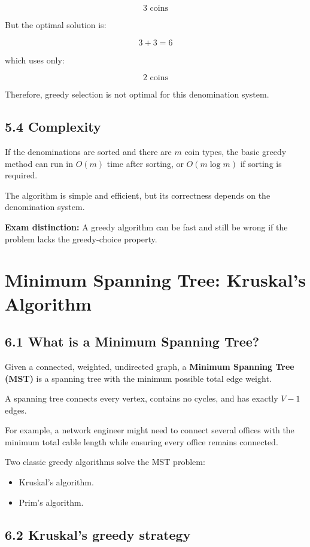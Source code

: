 \[
\boxed{3\text{ coins}}
\]


But the optimal solution is:


\[
3+3=6
\]


which uses only:


\[
\boxed{2\text{ coins}}
\]


Therefore, greedy selection is not optimal for this denomination system.

\subsection{5.4 Complexity}

If the denominations are sorted and there are $m$ coin types, the basic greedy method can run in $O(m)$ time after sorting, or $O(m\log m)$ if sorting is required.

The algorithm is simple and efficient, but its correctness depends on the denomination system.

\textbf{Exam distinction:} A greedy algorithm can be fast and still be wrong if the problem lacks the greedy-choice property.

\section{Minimum Spanning Tree: Kruskal's Algorithm}

\subsection{6.1 What is a Minimum Spanning Tree?}

Given a connected, weighted, undirected graph, a \textbf{Minimum Spanning Tree (MST)} is a spanning tree with the minimum possible total edge weight.

A spanning tree connects every vertex, contains no cycles, and has exactly $V-1$ edges.

For example, a network engineer might need to connect several offices with the minimum total cable length while ensuring every office remains connected.

Two classic greedy algorithms solve the MST problem:

\begin{itemize}
    \item Kruskal's algorithm.
    \item Prim's algorithm.
\end{itemize}

\subsection{6.2 Kruskal's greedy strategy}

